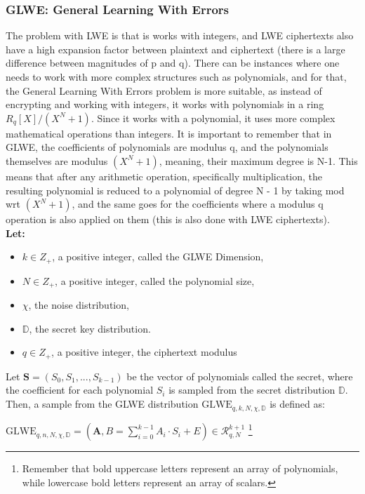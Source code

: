 \documentclass{report}
\begin{document}
\subsubsection{GLWE: General Learning With Errors}
The problem with LWE is that is works with integers, and LWE ciphertexts also have a high expansion factor between plaintext and ciphertext (there is a large difference between magnitudes of p and q). There can be instances where one needs to work with more complex structures such as polynomials, and for that, the General Learning With Errors problem is more suitable,  as instead of encrypting and working with integers, it works with polynomials in a ring $R_q[X] / (X^N + 1)$. Since it works with a polynomial, it uses more complex mathematical operations than integers. It is important to remember that in GLWE, the coefficients of polynomials are modulus q, and the polynomials themselves are modulus $(X^N + 1)$, meaning, their maximum degree is N-1. This means that after any arithmetic operation, specifically multiplication, the resulting polynomial is reduced to a polynomial of degree N - 1 by taking mod wrt $(X^N  + 1)$, and the same goes for the coefficients where a modulus q operation is also applied on them (this is also done with LWE ciphertexts). \\
\textbf{Let:}
\begin{itemize}
	\item $k \in Z_+$, a positive integer, called the GLWE Dimension,
	\item $N \in Z_+$, a positive integer, called the polynomial size,
	\item $\chi$, the noise distribution,
	\item $\mathbb{D}$, the secret key distribution.
	\item $q \in Z_+$, a positive integer, the ciphertext modulus
\end{itemize}
Let $\textbf{S} = (S_0, S_1, ..., S_{k-1})$ be the vector of polynomials called the secret, where the coefficient for each polynomial $S_i$ is sampled from the secret distribution $\mathbb{D}$. Then, a sample from the GLWE distribution $\text{GLWE}_{q, k, N, \chi, \mathbb{D}}$ is defined as:
\begin{center}
	$\text{GLWE}_{q, n, N, \chi, \mathbb{D}} = (\textbf{A}, B = \sum\limits_{i=0}^{k-1} A_i \cdot S_i + E) \in \mathcal{R}_{q, N}^{k+1}$ \footnote{Remember that bold uppercase letters represent an array of polynomials, while lowercase bold letters represent an array of scalars.}
\end{center}
\end{document}
